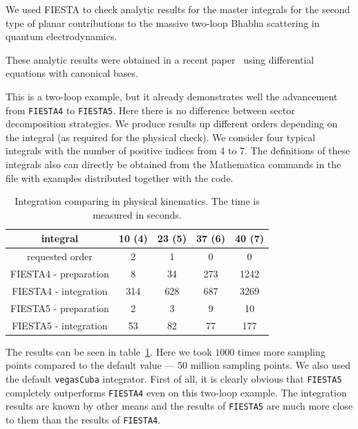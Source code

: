 \documentclass[preprint,12pt]{elsarticle}
\begin{document}
We used FIESTA to check analytic results for the master integrals for the second type of planar contributions to the massive two-loop Bhabha scattering in quantum electrodynamics.

These analytic results were obtained in a recent paper~\cite{Duhr:2021fhk} using differential equations with canonical bases.

This is a two-loop example, but it already demonstrates well the advancement from {\tt FIESTA4} to {\tt FIESTA5}. Here there is no difference between sector decomposition strategies. We produce results up different orders depending on the integral (as required for the physical check). We consider four typical integrals with the number of positive indices from 4 to 7. The definitions of these integrals also can directly be obtained from the Mathematica commands in the file with examples distributed together with the code.

\begin{table}[ht]
\begin{center}
 \begin{tabular}{|c|c|c|c|c|}
 \hline
 integral                  & 10 (4) &  23 (5) &  37 (6)   & 40 (7)\\
 \hline
 requested order           & 2      &  1      &  0        & 0   \\
 FIESTA4 - preparation     & 8      &  34     &  273      & 1242 \\
 FIESTA4 - integration     & 314    &  628    &  687      & 3269 \\
 FIESTA5 - preparation     & 2      &  3      &  9        & 10    \\ 
 FIESTA5 - integration     & 53     &  82     &  77       & 177    \\
\hline
 \end{tabular}
 \caption{Integration comparing in physical kinematics. The time is measured in seconds.\label{pl2}}
 \end{center}
\end{table}

The results can be seen in table~\ref{pl2}. Here we took $1000$ times more sampling points compared to the default value --- $50$ million sampling points. We also used the default {\tt vegasCuba} integrator. First of all, it is clearly obvious that {\tt FIESTA5} completely outperforms {\tt FIESTA4} even on this two-loop example. The integration results are known by other means and the results of {\tt FIESTA5} are much more close to them than the results of {\tt FIESTA4}.
\end{document}
